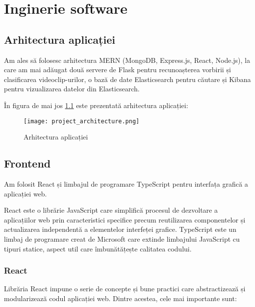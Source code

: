 \chapter{Inginerie software}

\section{Arhitectura aplicației}
Am ales să folosesc arhitectura MERN (MongoDB, Express.js, React, Node.js), la care am mai adăugat
două servere de Flask pentru recunoașterea vorbirii și clasificarea videoclip-urilor, o bază de
date Elasticsearch pentru căutare și Kibana pentru vizualizarea datelor din Elasticsearch.
\par
În figura de mai jos \ref{fig:project-architecture} este prezentată arhitectura aplicației:

\begin{figure}[h]
    \centering
    \texttt{[image: project\_architecture.png]}
    \caption{Arhitectura aplicației}
    \label{fig:project-architecture}
\end{figure}


\section{Frontend}
Am folosit React și limbajul de programare TypeScript pentru interfața grafică a aplicației web. 
\par
React este o librărie JavaScript care simplifică procesul de dezvoltare a aplicațiilor web prin 
caracteristici specifice precum reutilizarea componentelor și actualizarea independentă a
elementelor interfeței grafice. TypeScript este un limbaj de programare creat de Microsoft care
extinde limbajului JavaScript cu tipuri statice, aspect util care îmbunătățește calitatea codului.

\subsection{React}
Librăria React impune o serie de concepte și bune practici care abstractizează și modularizează
codul aplicației web. Dintre acestea, cele mai importante sunt:

